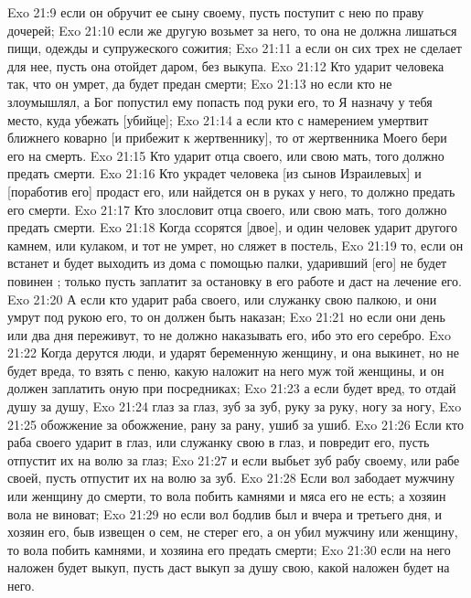 \vs Exo 21:9 если он обручит ее сыну своему, пусть поступит с нею по праву дочерей;
\vs Exo 21:10 если же другую возьмет за него, то она не должна лишаться пищи, одежды и супружеского сожития;
\vs Exo 21:11 а если он сих трех  не сделает для нее, пусть она отойдет даром, без выкупа.
\rsbpar\vs Exo 21:12 Кто ударит человека так, что он умрет, да будет предан смерти;
\vs Exo 21:13 но если кто не злоумышлял, а Бог попустил ему попасть под руки его, то Я назначу у тебя место, куда убежать [убийце];
\vs Exo 21:14 а если кто с намерением умертвит ближнего коварно [и прибежит к жертвеннику], то  от жертвенника Моего бери его на смерть.
\rsbpar\vs Exo 21:15 Кто ударит отца своего, или свою мать, того должно предать смерти.
\rsbpar\vs Exo 21:16 Кто украдет человека [из сынов Израилевых] и [поработив его] продаст его, или найдется он в руках у него, то должно предать его смерти.
\rsbpar\vs Exo 21:17 Кто злословит отца своего, или свою мать, того должно предать смерти.
\rsbpar\vs Exo 21:18 Когда ссорятся [двое], и один человек ударит другого камнем, или кулаком, и тот не умрет, но сляжет в постель,
\vs Exo 21:19 то, если он встанет и будет выходить из дома с помощью палки, ударивший [его] не будет повинен ; только пусть заплатит за остановку в его работе и даст на лечение его.
\vs Exo 21:20 А если кто ударит раба своего, или служанку свою палкою, и они умрут под рукою его, то он должен быть наказан;
\vs Exo 21:21 но если они день или два дня переживут, то не должно наказывать его, ибо это его серебро.
\rsbpar\vs Exo 21:22 Когда дерутся люди, и ударят беременную женщину, и она выкинет, но не будет  вреда, то взять с  пеню, какую наложит на него муж той женщины, и он должен заплатить оную при посредниках;
\vs Exo 21:23 а если будет вред, то отдай душу за душу,
\vs Exo 21:24 глаз за глаз, зуб за зуб, руку за руку, ногу за ногу,
\vs Exo 21:25 обожжение за обожжение, рану за рану, ушиб за ушиб.
\rsbpar\vs Exo 21:26 Если кто раба своего ударит в глаз, или служанку свою в глаз, и повредит его, пусть отпустит их на волю за глаз;
\vs Exo 21:27 и если выбьет зуб рабу своему, или рабе своей, пусть отпустит их на волю за зуб.
\rsbpar\vs Exo 21:28 Если вол забодает мужчину или женщину до смерти, то вола побить камнями и мяса его не есть; а хозяин вола не виноват;
\vs Exo 21:29 но если вол бодлив был и вчера и третьего дня, и хозяин его, быв извещен о сем, не стерег его, а он убил мужчину или женщину, то вола побить камнями, и хозяина его предать смерти;
\vs Exo 21:30 если на него наложен будет выкуп, пусть даст выкуп за душу свою, какой наложен будет на него.
